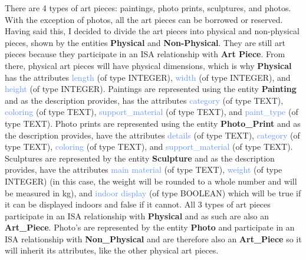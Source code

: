 \documentclass[11pt]{article}
\begin{document}
There are 4 types of art pieces: paintings, photo prints, sculptures, and photos. With the exception of photos, all the art pieces can be borrowed or reserved. Having said this, I decided to divide the art pieces into physical and non-physical pieces, shown by the entities \textbf{Physical} and \textbf{Non-Physical}. They are still art pieces because they participate in an ISA relationship with \textbf{Art Piece}. From there, physical art pieces will have physical dimensions, which is why \textbf{Physical} has the attributes \textcolor{CornflowerBlue}{length} (of type INTEGER), \textcolor{CornflowerBlue}{width} (of type INTEGER), and \textcolor{CornflowerBlue}{height} (of type INTEGER). Paintings are represented using the entity \textbf{Painting} and as the description provides, has the attributes \textcolor{CornflowerBlue}{category} (of type TEXT), \textcolor{CornflowerBlue}{coloring} (of type TEXT), \textcolor{CornflowerBlue}{support\_material} (of type TEXT), and \textcolor{CornflowerBlue}{paint\_type} (of type TEXT). Photo prints are represented using the entity \textbf{Photo\_Print} and as the description provides, have the attributes \textcolor{CornflowerBlue}{details} (of type TEXT), \textcolor{CornflowerBlue}{category} (of type TEXT), \textcolor{CornflowerBlue}{coloring} (of type TEXT), and \textcolor{CornflowerBlue}{support\_material} (of type TEXT). Sculptures are represented by the entity \textbf{Sculpture} and as the description provides, have the attributes \textcolor{CornflowerBlue}{main material} (of type TEXT), \textcolor{CornflowerBlue}{weight} (of type INTEGER) (in this case, the weight will be rounded to a whole number and will be measured in kg), and \textcolor{CornflowerBlue}{indoor display} (of type BOOLEAN) which will be true if it can be displayed indoors and false if it cannot. All 3 types of art pieces participate in an ISA relationship with \textbf{Physical} and as such are also an \textbf{Art\_Piece}. Photo's are represented by the entity \textbf{Photo} and participate in an ISA relationship with \textbf{Non\_Physical} and are therefore also an \textbf{Art\_Piece} so it will inherit its attributes, like the other physical art pieces. \\
\end{document}
